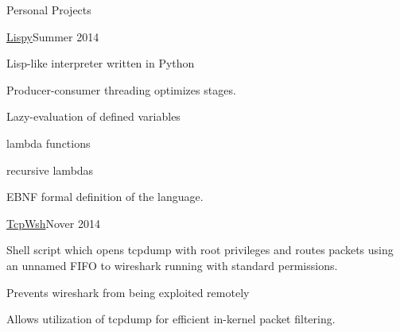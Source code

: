 \documentclass{resume} %
\begin{document}
\clearpage

\begin{rSection}{Personal Projects}

\begin{rSubsection}{\href{http://github.com/cptaffe/lispy}{Lispy}}{Summer 2014}{}{}

	\item Lisp-like interpreter written in Python
	\item Producer-consumer threading optimizes stages.
	\item Lazy-evaluation of defined variables
	\item lambda functions
	\item recursive lambdas
	\item EBNF formal definition of the language.
\end{rSubsection}

\begin{rSubsection}{\href{http://github.com/cptaffe/tcpwsh}{TcpWsh}}{Nover 2014}{}{}

	\item Shell script which opens tcpdump with root privileges and routes packets using an unnamed FIFO to wireshark running with standard permissions.
	\item Prevents wireshark from being exploited remotely
	\item Allows utilization of tcpdump for efficient in-kernel packet filtering.
\end{rSubsection}

\end{rSection}

\end{document}
